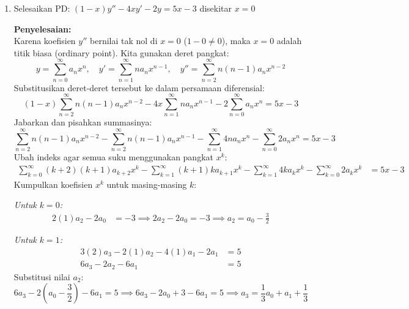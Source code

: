 \documentclass[11pt,a4paper]{article}
\begin{document}
\begin{enumerate}
        \textit{Solusi Umum:}
        \begin{equation*}
          U_n = C_1 2^n + C_2 (-2)^n + n 2^{n-3}
        \end{equation*}

        \vspace{0.5cm}

  \item Selesaikan PD: $(1 - x)y'' - 4xy' - 2y = 5x - 3$ disekitar $x = 0$

        \textbf{Penyelesaian:} \\
        Karena koefisien $y''$ bernilai tak nol di $x=0$ ($1-0 \neq 0$), maka $x=0$ adalah titik biasa (ordinary point). Kita gunakan deret pangkat:
        \begin{equation*}
          y = \sum_{n=0}^{\infty} a_n x^n, \quad y' = \sum_{n=1}^{\infty} n a_n x^{n-1}, \quad y'' = \sum_{n=2}^{\infty} n(n-1) a_n x^{n-2}
        \end{equation*}
        Substitusikan deret-deret tersebut ke dalam persamaan diferensial:
        \begin{equation*}
          (1-x)\sum_{n=2}^{\infty} n(n-1) a_n x^{n-2} - 4x \sum_{n=1}^{\infty} n a_n x^{n-1} - 2\sum_{n=0}^{\infty} a_n x^n = 5x - 3
        \end{equation*}
        Jabarkan dan pisahkan summasinya:
        \begin{equation*}
          \sum_{n=2}^{\infty} n(n-1) a_n x^{n-2} - \sum_{n=2}^{\infty} n(n-1) a_n x^{n-1} - \sum_{n=1}^{\infty} 4n a_n x^n - \sum_{n=0}^{\infty} 2a_n x^n = 5x - 3
        \end{equation*}
        Ubah indeks agar semua suku menggunakan pangkat $x^k$:
        \begin{align*}
          \sum_{k=0}^{\infty} (k+2)(k+1) a_{k+2} x^k - \sum_{k=1}^{\infty} (k+1)k a_{k+1} x^k - \sum_{k=1}^{\infty} 4k a_k x^k - \sum_{k=0}^{\infty} 2a_k x^k & = 5x - 3
        \end{align*}
        Kumpulkan koefisien $x^k$ untuk masing-masing $k$:

        \textit{Untuk $k=0$:}
        \begin{align*}
          2(1) a_2 - 2 a_0 & = -3 \implies 2a_2 - 2a_0 = -3 \implies a_2 = a_0 - \frac{3}{2}
        \end{align*}

        \textit{Untuk $k=1$:}
        \begin{align*}
          3(2) a_3 - 2(1) a_2 - 4(1) a_1 - 2 a_1 & = 5 \\
          6a_3 - 2a_2 - 6a_1                     & = 5
        \end{align*}
        Substitusi nilai $a_2$:
        \begin{equation*}
          6a_3 - 2\left(a_0 - \frac{3}{2}\right) - 6a_1 = 5 \implies 6a_3 - 2a_0 + 3 - 6a_1 = 5 \implies a_3 = \frac{1}{3}a_0 + a_1 + \frac{1}{3}
        \end{equation*}


\end{enumerate}
\end{document}
